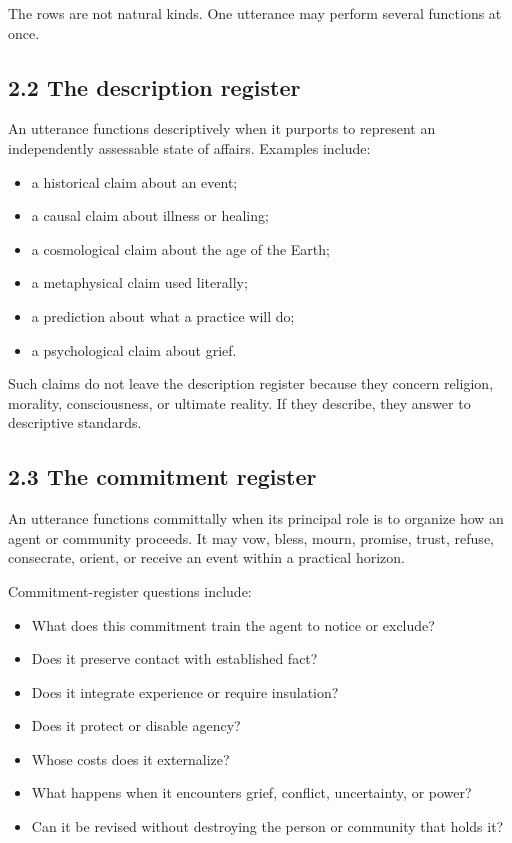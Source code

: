 \documentclass[
  11pt,
]{article}
\providecommand{\tightlist}{%
  \setlength{\itemsep}{0pt}\setlength{\parskip}{0pt}}
\begin{document}
The rows are not natural kinds. One utterance may perform several
functions at once.

\subsection{2.2 The description
register}\label{the-description-register}

An utterance functions descriptively when it purports to represent an
independently assessable state of affairs. Examples include:

\begin{itemize}
\tightlist
\item
  a historical claim about an event;
\item
  a causal claim about illness or healing;
\item
  a cosmological claim about the age of the Earth;
\item
  a metaphysical claim used literally;
\item
  a prediction about what a practice will do;
\item
  a psychological claim about grief.
\end{itemize}

Such claims do not leave the description register because they concern
religion, morality, consciousness, or ultimate reality. If they
describe, they answer to descriptive standards.

\subsection{2.3 The commitment register}\label{the-commitment-register}

An utterance functions committally when its principal role is to
organize how an agent or community proceeds. It may vow, bless, mourn,
promise, trust, refuse, consecrate, orient, or receive an event within a
practical horizon.

Commitment-register questions include:

\begin{itemize}
\tightlist
\item
  What does this commitment train the agent to notice or exclude?
\item
  Does it preserve contact with established fact?
\item
  Does it integrate experience or require insulation?
\item
  Does it protect or disable agency?
\item
  Whose costs does it externalize?
\item
  What happens when it encounters grief, conflict, uncertainty, or
  power?
\item
  Can it be revised without destroying the person or community that
  holds it?
\end{itemize}
\end{document}
